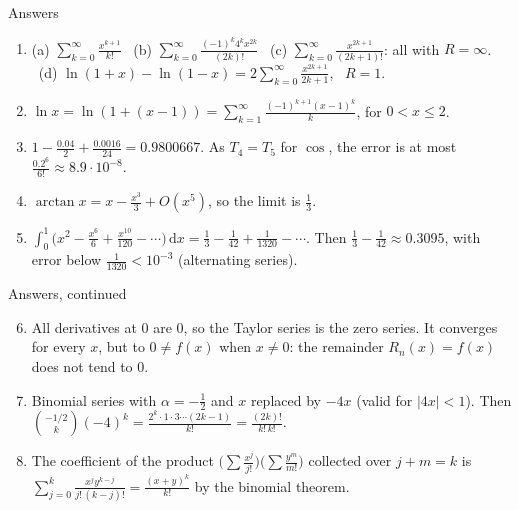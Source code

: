 \documentclass[10pt]{wosm-slides}
\newcommand{\dx}{\,\mathrm{d}x}
\begin{document}
\begin{frame}{Answers}
  \small
  \begin{enumerate}
    \item (a) $\sum_{k=0}^\infty \frac{x^{k+1}}{k!}$ \
      (b) $\sum_{k=0}^\infty \frac{(-1)^k 4^k x^{2k}}{(2k)!}$ \
      (c) $\sum_{k=0}^\infty \frac{x^{2k+1}}{(2k+1)!}$: all with $R = \infty$. \
      (d) $\ln(1+x) - \ln(1-x) = 2 \sum_{k=0}^\infty \frac{x^{2k+1}}{2k+1}$, \ $R = 1$.
    \item $\ln x = \ln(1 + (x - 1)) = \sum_{k=1}^\infty \frac{(-1)^{k+1}(x-1)^k}{k}$, for $0 < x \le 2$.
    \item $1 - \frac{0.04}{2} + \frac{0.0016}{24} = 0.9800667$. As $T_4 = T_5$ for $\cos$,
      the error is at most $\frac{0.2^6}{6!} \approx 8.9 \cdot 10^{-8}$.
    \item $\arctan x = x - \frac{x^3}{3} + O(x^5)$, so the limit is $\frac13$.
    \item $\int_0^1 \bigl(x^2 - \frac{x^6}{6} + \frac{x^{10}}{120} - \cdots\bigr)\dx
      = \frac13 - \frac{1}{42} + \frac{1}{1320} - \cdots$. Then $\frac13 - \frac1{42} \approx 0.3095$,
      with error below $\frac{1}{1320} < 10^{-3}$ (alternating series).
  \end{enumerate}
\end{frame}

\begin{frame}{Answers, continued}
  \small
  \begin{enumerate}
    \setcounter{enumi}{5}
    \item All derivatives at $0$ are $0$, so the Taylor series is the zero series. It
      converges for every $x$, but to $0 \ne f(x)$ when $x \ne 0$: the remainder
      $R_n(x) = f(x)$ does not tend to $0$.
    \item Binomial series with $\alpha = -\frac12$ and $x$ replaced by $-4x$ (valid for
      $|4x| < 1$). Then $\binom{-1/2}{k}(-4)^k = \frac{2^k \cdot 1 \cdot 3 \cdots (2k-1)}{k!}
      = \frac{(2k)!}{k!\,k!}$.
    \item The coefficient of the product $\bigl(\sum \frac{x^j}{j!}\bigr)\bigl(\sum \frac{y^m}{m!}\bigr)$
      collected over $j + m = k$ is
      $\sum_{j=0}^k \frac{x^j y^{k-j}}{j!\,(k-j)!} = \frac{(x+y)^k}{k!}$ by the binomial theorem.
  \end{enumerate}
\end{frame}
\end{document}
